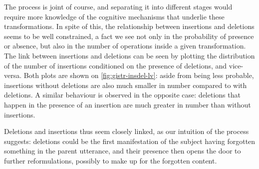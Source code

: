 The process is joint of course, and separating it into different stages
would require more knowledge of the cognitive mechanisms that underlie
these transformations. In spite of this, the relationship between
insertions and deletions seems to be well constrained, a fact we see not
only in the probability of presence or absence, but also in the number
of operations inside a given transformation. The link between insertions
and deletions can be seen by plotting the distribution of the number of
insertions conditioned on the presence of deletions, and vice-versa.
Both plots are shown on \cref{fig:gistr-insdel-lv}: aside from being
less probable, insertions without deletions are also much smaller in
number compared to with deletions. A similar behaviour is observed in
the opposite case: deletions that happen in the presence of an insertion
are much greater in number than without insertions.

Deletions and insertions thus seem closely linked, as our intuition of
the process suggests: deletions could be the first manifestation of the
subject having forgotten something in the parent utterance, and their
presence then opens the door to further reformulations, possibly to make
up for the forgotten content.

